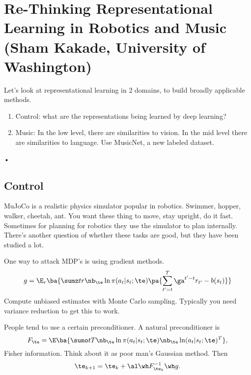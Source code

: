 \section{Re-Thinking Representational Learning in Robotics and Music (Sham Kakade, University of Washington)}


Let's look at representational learning in 2 domains, to build broadly applicable methods.
\begin{enumerate}
\item
Control: what are the representations being learned by deep learning?
\item
Music: In the low level, there are similarities to vision. In the mid level there are similarities to language. Use MusicNet, a new labeled dataset.
\end{enumerate}•

\subsection{Control}

MuJoCo is a realistic physics simulator popular in robotics.  Swimmer, hopper, walker, cheetah, ant. You want these thing to move, stay upright, do it fast. Sometimes for planning for robotics they use the simulator to plan internally. %
There's another question of whether these tasks are good, but they have been studied a lot.


%

One way to attack MDP's is using gradient methods.
$$
g = \E_r \ba{\sumz tr \nb_\te \ln \pi(a_t|s_t;\te) \pa{\sum_{t'=t}^T \ga^{t'-t} r_{t'}-b(s_t)}}
$$
Compute unbiased estimates with Monte Carlo sampling. Typically you need variance reduction to get this to work.

People tend to use a certain preconditioner. A natural preconditioner is
$$
F_\te = \E\ba{\sumo t T \nb_\te \ln \pi(a_t|s_t;\te)\nb_\te\ln (a_t|s_t;\te)^T},
$$
Fisher information. Think about it as poor man's Gaussian method.
Then 
$$\te_{k+1}=\te_k + \al \wh F_{\te_k}^{-1}\wh g.$$

